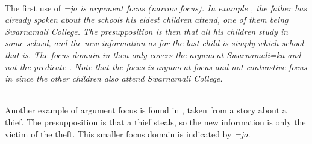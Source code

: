 
\\ 
 
 
The first use of \em =jo \em is argument focus (narrow focus). In example , the father has already spoken about the schools his eldest children attend, one of them being Swarnamali College. The presupposition is then that all his children study in some school, and the new information as for the last child is simply which school that is. The focus domain in   then only covers the argument \em Swarnamali=ka \em and not the predicate . Note that the focus is argument focus and not contrastive focus  in   since the other children also attend Swarnamali College.


\\ 


% 
% 
Another example of argument focus is found in , taken from a story about a thief.  
The presupposition is that a thief steals, so the new information is only the victim of the theft. This smaller focus domain is indicated by \em =jo\em.

